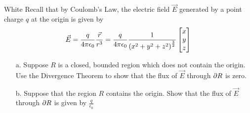 \documentclass[titlepage]{article}
\begin{document}
\begin{cproblem}{5}{White}
Recall that by Coulomb's Law, the electric field $\vec{E}$ generated by a point charge $q$ at the origin is given by
$$ \vec{E} = \frac{q}{4\pi\epsilon_0} \frac{\vec{r}}{r^3} = \frac{q}{4\pi\epsilon_0}\frac{1}{\left(x^2 + y^2 + z^2\right)^{\frac{3}{2}}}\bmat{x \\ y \\ z}$$
\begin{itemize}
\item[a.] Suppose $R$ is a closed, bounded region which does not contain the origin. Use the Divergence Theorem to show that the flux of $\vec{E}$ through $\partial R$ is zero.
\item[b.] Suppose that the region $R$ contains the origin. Show that the flux of $\vec{E}$ through $\partial R$ is given by $\frac{q}{\epsilon_0}$
\end{itemize}
\end{cproblem}
\end{document}
